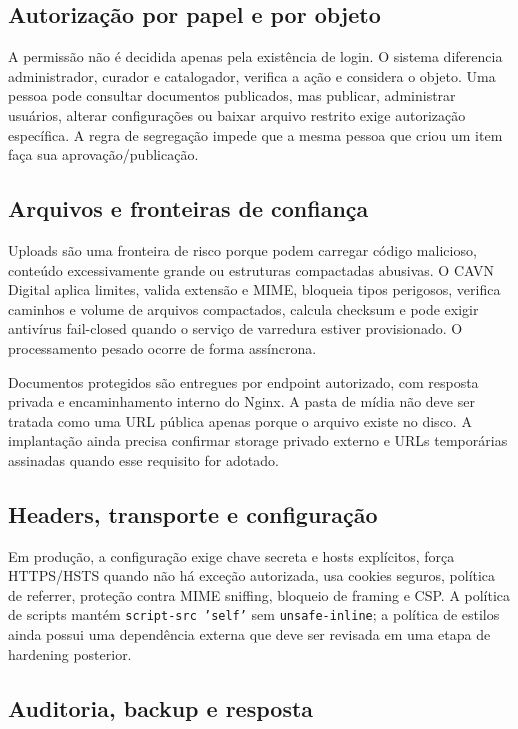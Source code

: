 \documentclass[11pt,a4paper]{article}
\newcommand{\code}[1]{\texttt{#1}}
\begin{document}
\subsection{Autorização por papel e por objeto}

A permissão não é decidida apenas pela existência de login. O sistema diferencia administrador, curador e catalogador, verifica a ação e considera o objeto. Uma pessoa pode consultar documentos publicados, mas publicar, administrar usuários, alterar configurações ou baixar arquivo restrito exige autorização específica. A regra de segregação impede que a mesma pessoa que criou um item faça sua aprovação/publicação.

\subsection{Arquivos e fronteiras de confiança}

Uploads são uma fronteira de risco porque podem carregar código malicioso, conteúdo excessivamente grande ou estruturas compactadas abusivas. O CAVN Digital aplica limites, valida extensão e MIME, bloqueia tipos perigosos, verifica caminhos e volume de arquivos compactados, calcula checksum e pode exigir antivírus fail-closed quando o serviço de varredura estiver provisionado. O processamento pesado ocorre de forma assíncrona.

Documentos protegidos são entregues por endpoint autorizado, com resposta privada e encaminhamento interno do Nginx. A pasta de mídia não deve ser tratada como uma URL pública apenas porque o arquivo existe no disco. A implantação ainda precisa confirmar storage privado externo e URLs temporárias assinadas quando esse requisito for adotado.

\subsection{Headers, transporte e configuração}

Em produção, a configuração exige chave secreta e hosts explícitos, força HTTPS/HSTS quando não há exceção autorizada, usa cookies seguros, política de referrer, proteção contra MIME sniffing, bloqueio de framing e CSP. A política de scripts mantém \code{script-src 'self'} sem \code{unsafe-inline}; a política de estilos ainda possui uma dependência externa que deve ser revisada em uma etapa de hardening posterior.

\subsection{Auditoria, backup e resposta}
\end{document}
